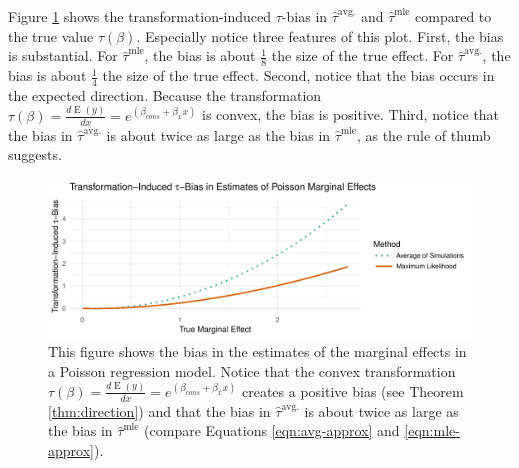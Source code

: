 \documentclass[10pt]{article}
\DeclareMathOperator*{\E}{\text{E}}
\begin{document}
Figure \ref{fig:poisson-mcs} shows the transformation-induced $\tau$-bias in $\hat{\tau}^\text{avg.}$ and $\hat{\tau}^\text{mle}$ compared to the true value $\tau(\beta)$. 
Especially notice three features of this plot. 
First, the bias is substantial. 
For $\hat{\tau}^\text{mle}$, the bias is about $\frac{1}{8}$ the size of the true effect. 
For $\hat{\tau}^\text{avg.}$, the bias is about $\frac{1}{4}$ the size of the true effect. 
Second, notice that the bias occurs in the expected direction. 
Because the transformation $\tau(\beta) = \frac{d \E (y)}{dx} = e^{(\beta_{cons} + \beta_x x)}$ is convex, the bias is positive. 
Third, notice that the bias in $\hat{\tau}^\text{avg.}$ is about twice as large as the bias in $\hat{\tau}^\text{mle}$, as the rule of thumb suggests.

\begin{figure}[h!]
\begin{center}
\includegraphics[scale = 0.6]{figs/poisson-mcs.pdf}
\caption{This figure shows the bias in the estimates of the marginal effects in a Poisson regression model. Notice that the convex transformation $\tau(\beta) = \frac{d \E (y)}{dx} = e^{(\beta_{cons} + \beta_x x)}$ creates a positive bias (see Theorem \ref{thm:direction}) and that the bias in $\hat{\tau}^\text{avg.}$ is about twice as large as the bias in $\hat{\tau}^\text{mle}$ (compare Equations \ref{eqn:avg-approx} and \ref{eqn:mle-approx}).}\label{fig:poisson-mcs}
\end{center}
\end{figure}

%
%
\end{document}
